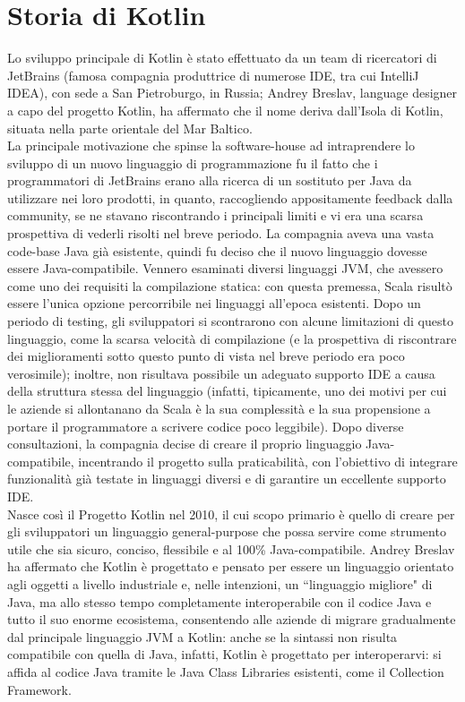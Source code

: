 \section{Storia di Kotlin}
Lo sviluppo principale di Kotlin è stato effettuato da un team di ricercatori di JetBrains (famosa compagnia produttrice di numerose IDE, tra cui IntelliJ IDEA), con sede a San Pietroburgo, in Russia; Andrey Breslav, language designer a capo del progetto Kotlin, ha affermato che il nome deriva dall’Isola di Kotlin, situata nella parte orientale del Mar Baltico.\\
La principale motivazione che spinse la software-house ad intraprendere lo sviluppo di un nuovo linguaggio di programmazione fu il fatto che i programmatori di JetBrains erano alla ricerca di un sostituto per Java da utilizzare nei loro prodotti, in quanto, raccogliendo appositamente feedback dalla community, se ne stavano riscontrando i principali limiti e vi era una scarsa prospettiva di vederli risolti nel breve periodo. La compagnia aveva una vasta code-base Java già esistente, quindi fu deciso che il nuovo linguaggio dovesse essere Java-compatibile. Vennero esaminati diversi linguaggi JVM, che avessero come uno dei requisiti la compilazione statica: con questa premessa, Scala risultò essere l'unica opzione percorribile nei linguaggi all’epoca esistenti. Dopo un periodo di testing, gli sviluppatori si scontrarono con alcune limitazioni di questo linguaggio, come la scarsa velocità di compilazione (e la prospettiva di riscontrare dei miglioramenti sotto questo punto di vista nel breve periodo era poco verosimile); inoltre, non risultava possibile un adeguato supporto IDE a causa della struttura stessa del linguaggio (infatti, tipicamente, uno dei motivi per cui le aziende si allontanano da Scala è la sua complessità e la sua propensione a portare il programmatore a scrivere codice poco leggibile). Dopo diverse consultazioni, la compagnia decise di creare il proprio linguaggio Java-compatibile, incentrando il progetto sulla praticabilità, con l’obiettivo di integrare funzionalità già testate in linguaggi diversi e di garantire un eccellente supporto IDE.\\

Nasce così il Progetto Kotlin nel 2010, il cui scopo primario è quello di creare per gli sviluppatori un linguaggio general-purpose che possa servire come strumento utile che sia sicuro, conciso, flessibile e al 100\% Java-compatibile. Andrey Breslav ha affermato che Kotlin è progettato e pensato per essere un linguaggio orientato agli oggetti a livello industriale e, nelle intenzioni, un “linguaggio migliore" di Java, ma allo stesso tempo completamente interoperabile con il codice Java e tutto il suo enorme ecosistema, consentendo alle aziende di migrare gradualmente dal principale linguaggio JVM a Kotlin: anche se la sintassi non risulta compatibile con quella di Java, infatti, Kotlin è progettato per interoperarvi: si affida al codice Java tramite le Java Class Libraries esistenti, come il Collection Framework. \\

